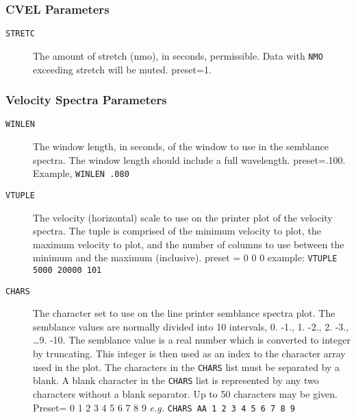 \subsubsection{CVEL Parameters}

\begin{description}
\item[\texttt{STRETC}] The amount of stretch (nmo), in seconds, permissible.  Data with \texttt{NMO} exceeding stretch will be muted.  \Gls{preset}=1.
\end{description}

\subsubsection{Velocity Spectra Parameters}

\begin{description}
\item[\texttt{WINLEN}] The window length, in seconds, of the window to use in the semblance spectra.  The window length should include a full wavelength.  \Gls{preset}=.100.  Example, \texttt{WINLEN .080}

\item[\texttt{VTUPLE}] The velocity (horizontal) scale to use on the printer plot of the velocity spectra.  The tuple is comprised of the minimum velocity to plot, the maximum velocity to plot, and the number of columns to use between the minimum and the maximum (inclusive).  \Gls{preset} = 0 0 0 example: \texttt{VTUPLE 5000 20000 101}

\item[\texttt{CHARS}] The character set to use on the line printer semblance spectra
         plot. The semblance values are normally divided into 10
         intervals, 0. -1., 1. -2., 2. -3., \ldots 9. -10.  The semblance
         value is a real number which is converted to integer by
         truncating.  This integer is then used as an index to the
         character array used in the plot.  The characters in the \texttt{CHARS}
         list must be separated by a blank.  A blank character in the
         \texttt{CHARS} list is represented by any two characters without a blank
         separator.  Up to 50 characters may be given.
         Preset= 0 1 2 3 4 5 6 7 8 9  \textit{e.g.}  \texttt{CHARS AA 1 2 3 4 5 6 7 8 9}


\end{description}
